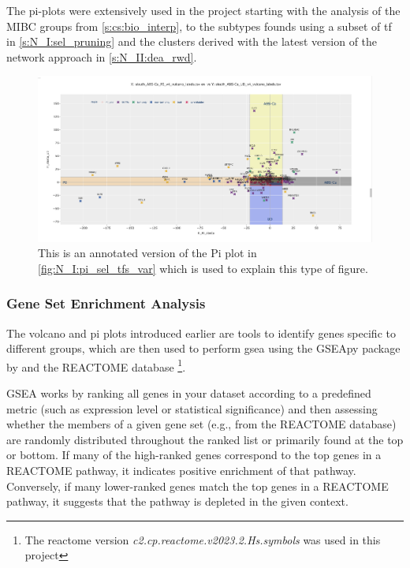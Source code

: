 The pi-plots were extensively used in the project starting with the analysis of the MIBC groups from \cref{s:cs:bio_interp}, to the subtypes founds using a subset of \acrlong{tf} in \cref{s:N_I:sel_pruning} and the clusters derived with the latest version of the network approach in \cref{s:N_II:dea_rwd}.

\begin{figure}[!htb]    
    \centering
    \includegraphics[width=1.0\textwidth,height=1.0\textheight,keepaspectratio]{Sections/Network_I/Resources/selective_pruning/sel_tfs_pi_all_var_rect.png}
    \caption{This is an annotated version of the Pi plot in \cref{fig:N_I:pi_sel_tfs_var} which is used to explain this type of figure.}
    \label{fig:lit:pi_eg}
\end{figure}

\subsubsection{Gene Set Enrichment Analysis} \label{s:lit:gsea}

The volcano and pi plots introduced earlier are tools to identify genes specific to different groups, which are then used to perform \acrfull{gsea} using the GSEApy package by \citet{Fang2023-ec} and the REACTOME database\cite{Milacic2024-yt} \footnote{The reactome version \textit{c2.cp.reactome.v2023.2.Hs.symbols }was used in this project}.

GSEA works by ranking all genes in your dataset according to a predefined metric (such as expression level or statistical significance) and then assessing whether the members of a given gene set (e.g., from the REACTOME database) are randomly distributed throughout the ranked list or primarily found at the top or bottom. If many of the high-ranked genes correspond to the top genes in a REACTOME pathway, it indicates positive enrichment of that pathway. Conversely, if many lower-ranked genes match the top genes in a REACTOME pathway, it suggests that the pathway is depleted in the given context.

